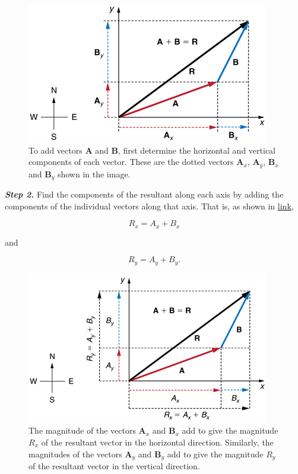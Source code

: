 \documentclass[
]{book}
\begin{document}
\begin{figure}
\hypertarget{import-auto-id1165296674934}{%
\centering
\includegraphics{images/Figure_03_03_06a.jpg}
\caption{To add vectors \(\mathbf{A}{}\) and \(\mathbf{B}{}\), first determine the
horizontal and vertical components of each vector. These are the dotted
vectors \(\mathbf{A}_{x}{}\), \(\mathbf{A}_{y}{}\), \(\mathbf{B}_{x}{}\) and
\(\textbf{B}_{y}\) shown in the
image.}\label{import-auto-id1165296674934}
}
\end{figure}

\emph{\textbf{Step 2.} }Find the components of the resultant along each axis by
adding the components of the individual vectors along that axis\emph{.} That
is, as shown in
\protect\hyperlink{import-auto-id1165298866862}{link},

\leavevmode{}%
\[{R_{x} = {A_{x} + B_{x}}}{}\]

and

\leavevmode{}%
\[{R_{y} = {A_{y} + B_{y}}}\text{.}{}\]

\begin{figure}
\hypertarget{import-auto-id1165298866862}{%
\centering
\includegraphics{images/Figure_03_03_07a.jpg}
\caption{The magnitude of the vectors \(\mathbf{A}_{x}{}\) and \(\mathbf{B}_{x}{}\)
add to give the magnitude \(R_{x}{}\) of the resultant vector in the
horizontal direction. Similarly, the magnitudes of the vectors
\(\mathbf{A}_{y}{}\) and \(\mathbf{B}_{y}{}\) add to give the magnitude
\(R_{y}{}\) of the resultant vector in the vertical
direction.}\label{import-auto-id1165298866862}
}
\end{figure}
\end{document}
